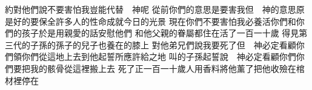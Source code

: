約對他們說\chientien 不要害怕\chientien 我豈能代替　神呢\chuan 
{}從前你們的意思是要害我\chientien 但　神的意思原是好的\chientien 要保全許多人的性命\chientien 成就今日的光景\yuentien 
{}現在你們不要害怕\chientien 我必養活你們\chientien 和你們的\chientien 孩子\yuentien 於是用親愛的話安慰他們\chuan\Chuan
{}和他父親的眷屬\chientien 都住在\yuentien{}活了一百一十歲\chuan 
{}得見第三代的子孫\yuentien{}的孫子的兒子\chientien 也養在的膝上\chuan 
{}對他弟兄們說\chientien 我要死了\chientien 但　神必定看顧你們\chientien 領你們從這地上去\chientien 到他起誓所應許給\chientien{}\chientien {}之地\chuan 
{}叫的子孫起誓\chientien 說\chientien 　神必定看顧你們\chientien 你們要把我的骸骨從這裡搬上去\chuan 
{}死了\chientien 正一百一十歲\yuentien 人用香料將他薰了\chientien 把他收殮在棺材裡\chientien 停在\chuan 
